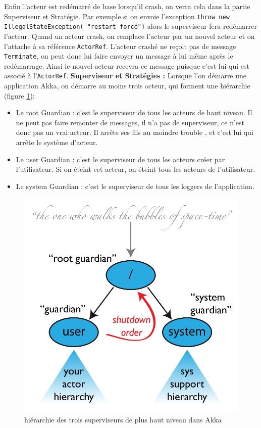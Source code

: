 \documentclass[12pt, a4paper]{article}
\begin{document}
\par Enfin l'acteur est redémarré de base lorsqu'il crash, on verra cela dans la partie Superviseur et Stratégie. Par exemple si on envoie l'exception \texttt{throw new IllegalStateException( "restart forcé")} alors le superviseur fera redémarrer l'acteur. Quand un acteur crash, on remplace l'acteur par un nouvel acteur et on l'attache à sa référence \verb!ActorRef!. L'acteur crashé ne reçoit pas de message \verb!Terminate!, on peut donc lui faire envoyer un message à lui même après le redémarrage. Ainsi le nouvel acteur recevra ce message puisque c'est lui qui est associé à l'\texttt{ActorRef}.
\newline
\newline
\textbf{Superviseur et Stratégies :}
Lorsque l'on démarre une application Akka, on démarre au moins trois acteur, qui forment une hiérarchie (figure \ref{fig2}): 
\begin{itemize}
\item Le root Guardian : c'est le superviseur de tous les acteurs de haut niveau. Il ne peut pas faire remonter de messages, il n'a pas de superviseur, ce n'est donc pas un vrai acteur. Il arrête ses fils  au moindre trouble \cite{akka}, et c'est lui qui arrête le système d'acteur.
\item Le user Guardian : c'est le superviseur de tous les acteurs créer par l'utilisateur. Si on éteint cet acteur, on éteint tous les acteurs de l'utilisateur.
\item Le system Guardian : c'est le superviseur de tous les loggers de l'application.
\newline
\end{itemize}

\begin{figure}
\centering
\includegraphics[scale=1]{guardians.png}
\caption{hiérarchie des trois superviseurs de plus haut niveau dans Akka \cite{akka}}
\label{fig2}
\end{figure}
\end{document}
